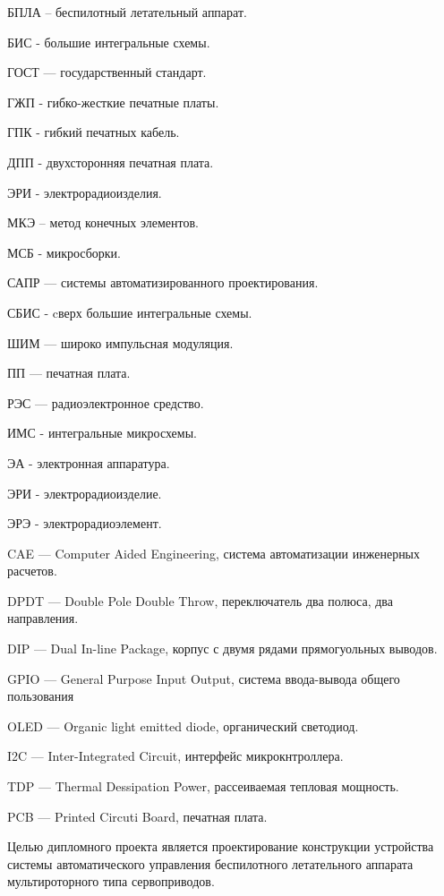 \tableofcontents
\newpage




БПЛА – беспилотный летательный аппарат.

БИС - большие интегральные схемы.

ГОСТ — государственный стандарт.

ГЖП - гибко-жесткие печатные платы.

ГПК - гибкий печатных кабель.

ДПП - двухсторонняя печатная плата.

ЭРИ - электрорадиоизделия.

МКЭ – метод конечных элементов.

МСБ - микросборки.

САПР — системы автоматизированного проектирования.

СБИС - cверх большие интегральные схемы.

ШИМ — широко импульсная модуляция.

ПП — печатная плата.

РЭС — радиоэлектронное средство.

ИМС - интегральные микросхемы.

ЭА - электронная аппаратура.

ЭРИ - электрорадиоизделие.

ЭРЭ - электрорадиоэлемент.

CAE — Computer Aided Engineering, система автоматизации инженерных расчетов.

DPDT — Double Pole Double Throw, переключатель два полюса, два направления.

DIP — Dual In-line Package, корпус с двумя рядами
прямогуольных выводов.

GPIO — General Purpose Input Output, система ввода-вывода общего пользования

OLED — Organic light emitted diode, органический светодиод.

I2C — Inter-Integrated Circuit, интерфейс микрокнтроллера.

TDP — Thermal Dessipation Power, рассеиваемая тепловая мощность.

PCB — Printed Circuti Board, печатная плата.

\newpage


Целью дипломного проекта является проектирование конструкции
устройства системы автоматического управления
беспилотного летательного аппарата мультироторного типа сервоприводов.

